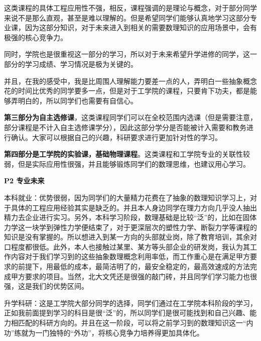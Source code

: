\documentclass[11pt,oneside]{book}
\begin{document}
这类课程的具体工程应用性不强，相反，课程强调的是理论与概念，对于部分同学来说不是那么直观，甚至是难以理解的。但是希望同学们能够认真地学习这部分专业课，因为这部分知识，对于未来进入到相关的需要数理知识的应用场景中，会有极强的核心竞争力。

\vspace{10pt}

同时，学院也是很重视这一部分的学习，所以对于未来希望升学进修的同学，这一部分的学习成绩、学习情况是极为关键的。

\vspace{10pt}

并且，在我的感受中，我是比周围人理解能力要差一点的人，弄明白一些抽象概念花的时间比优秀的同学要多一点，但是对于工学院的课程，只要肯下功夫，都是能够弄明白的，所以同学们也需要有自信心。

\vspace{10pt}

\textbf{第三部分为自主选修课}，这类课程同学们可以在全校范围内选课（但是需要注意，部分课程是不计入自主选修课学分），因此这部分学分是否能被计入需要和教务进行确认。大家可以根据自己的兴趣，科研要求进行更加针对性的学习。

\vspace{10pt}

\textbf{第四部分是工学院的实验课，基础物理课程}。这类课程和工学院专业的关联性较弱，但是实际应用性很强，并且能够锻炼同学们的数理思维，也建议用心学习。

\vspace{10pt}

\textbf{P2 专业未来}

本科就业：优势很弱，因为同学们的大量精力花费在了抽象的数理知识学习上，对于具体的工程应用经验其实是缺乏的。并且本人身边同学在理力方向几乎没人抽出精力去企业进行实习。另外，本科学习阶段，数理基础是比较“泛”的，比如在固体力学这一块学到弹性力学便结束了，对于更深层次的塑性力学、断裂力学等课程的知识是没有掌握的。所以想进入到某一方向的头部就业岗，除了教育培训，其余对口程度都很低。此外，本人也接触过某里、某方等头部企业的研发岗，我认为其工作内容对于我们学习到的这些抽象数理概念利用率低，而工作重心是在满足甲方要求的前提下，用最低的成本，最简洁明了的，最安全稳定的，最高效速成的方法完成甲方要求的项目。当然，北大文凭还是很强的敲门砖，并且同学们学习能力也很强，这是我们的优势区间。

\vspace{10pt}

升学科研：这是工学院大部分同学的选择，同学们通过在工学院本科阶段的学习，正如我前面提到学习的科目是很“泛”的，所以同学们是很可能找到和自己兴趣、能力相匹配的科研方向的。并且在这一阶段，可以将之前学习到的数理知识这一“内功”练就为一门独特的“外功”，将核心竞争力培养得更加具体化。
\end{document}
